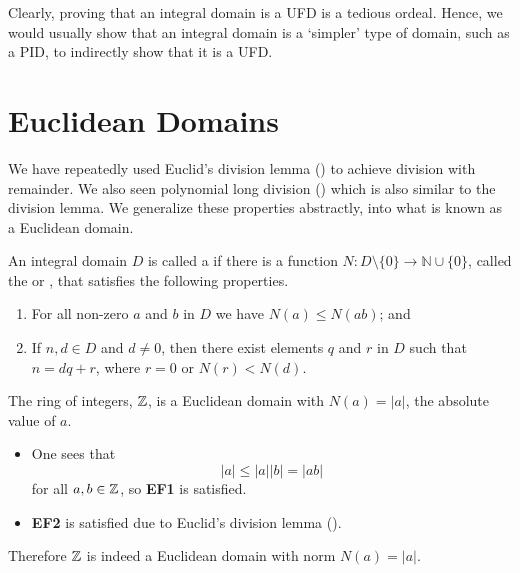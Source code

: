 Clearly, proving that an integral domain is a UFD is a tedious ordeal. Hence, we would usually show that an integral domain is a `simpler' type of domain, such as a PID, to indirectly show that it is a UFD.

\section{Euclidean Domains}
We have repeatedly used Euclid's division lemma () to achieve division with remainder. We also seen polynomial long division () which is also similar to the division lemma. We generalize these properties abstractly, into what is known as a Euclidean domain.

\begin{definition}
    An integral domain $D$ is called a  if there is a function $N: D \setminus \{0\} \to \mathbb{N} \cup \{0\}$, called the  or , that satisfies the following properties.
    \begin{enumerate}[leftmargin=3em,label=\textbf{EF\arabic*}.]
        \item For all non-zero $a$ and $b$ in $D$ we have $N(a) \leq N(ab)$; and
        \item If $n, d \in D$ and $d \neq 0$, then there exist elements $q$ and $r$ in $D$ such that $n = dq + r$, where $r = 0$ or $N(r) < N(d)$.
    \end{enumerate}
\end{definition}

\begin{example}
    The ring of integers, $\mathbb{Z}$, is a Euclidean domain with $N(a) = |a|$, the absolute value of $a$.
    \begin{itemize}
        \item One sees that
        \[
            |a| \leq |a||b| = |ab|
        \]
        for all $a,b\in \mathbb{Z}$, so \textbf{EF1} is satisfied.

        \item \textbf{EF2} is satisfied due to Euclid's division lemma ().
    \end{itemize}
    Therefore $\mathbb{Z}$ is indeed a Euclidean domain with norm $N(a) = |a|$.
\end{example}

